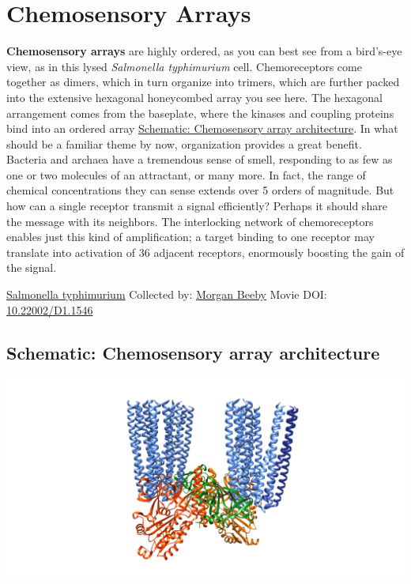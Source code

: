 \documentclass[]{tufte-book}
\begin{document}
\hypertarget{chemosensory-arrays}{%
\section{Chemosensory Arrays}\label{chemosensory-arrays}}

\textbf{Chemosensory arrays} are highly ordered, as you can best see from a bird's-eye view, as in this lysed \emph{Salmonella typhimurium} cell. Chemoreceptors come together as dimers, which in turn organize into trimers, which are further packed into the extensive hexagonal honeycombed array you see here. The hexagonal arrangement comes from the baseplate, where the kinases and coupling proteins bind into an ordered array \protect\hyperlink{Chemosensory_array_architecture}{Schematic: Chemosensory array architecture}. In what should be a familiar theme by now, organization provides a great benefit. Bacteria and archaea have a tremendous sense of smell, responding to as few as one or two molecules of an attractant, or many more. In fact, the range of chemical concentrations they can sense extends over 5 orders of magnitude. But how can a single receptor transmit a signal efficiently? Perhaps it should share the message with its neighbors. The interlocking network of chemoreceptors enables just this kind of amplification; a target binding to one receptor may translate into activation of 36 adjacent receptors, enormously boosting the gain of the signal.



\hypertarget{htmlwidget-1d16f2ea6659b60cf76e}{}

\label{fig:7-2}\protect\hyperlink{tree}{Salmonella typhimurium} Collected by: \protect\hyperlink{morgan_beeby}{Morgan Beeby} Movie DOI: \href{https://doi.org/10.22002/D1.1546}{10.22002/D1.1546}

\hypertarget{Chemosensory_array_architecture}{%
\subsection*{Schematic: Chemosensory array architecture}\label{Chemosensory_array_architecture}}

\includegraphics{img/schematics/7_2_1}
\end{document}

